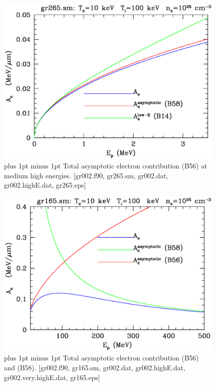 \documentclass[preprint,12pt,eqsecnum,nofootinbib,amsmath,amssymb]{revtex4}
\newcommand{\footnoteskip}{\baselineskip 12pt plus 1pt minus 1pt}
\begin{document}
\pagebreak

\vskip-2cm 
\begin{figure}[h!]
\includegraphics[scale=0.45]{gr265.eps} 
\vskip-0.8cm 
\caption{\footnoteskip  
  Total asymptotic electron contribution (B56) at medium high
  energies. [gr002.f90, gr265.sm, gr002.dat, gr002.highE.dat,
  gr265.eps] 
}
\label{fig:gr265}
\end{figure}

\vskip-2cm 
\begin{figure}[h!]
\includegraphics[scale=0.45]{gr165.eps} 
\vskip-0.8cm 
\caption{\footnoteskip  
  Total asymptotic electron contribution (B56) and (B58).  [gr002.f90,
  gr165.sm, gr002.dat, gr002.highE.dat, gr002.very.highE.dat, gr165.eps] 
}
\label{fig:gr165}
\end{figure}
\end{document}
